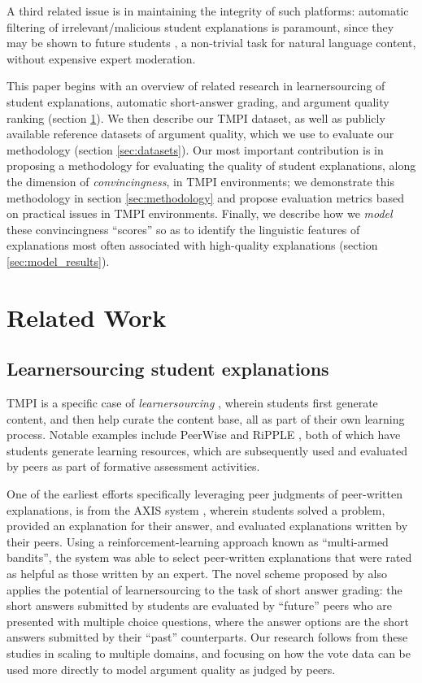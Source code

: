 \documentclass[notitlepage,12pt]{jedm}
\begin{document}
A third related issue is in maintaining the integrity of such platforms: 
automatic filtering of irrelevant/malicious student explanations is paramount, 
since they may be shown to future students \cite{gagnon_filtering_2019}, a 
non-trivial task for natural language content, without expensive expert 
moderation.

This paper begins with an overview of related research in learnersourcing of 
student explanations, automatic short-answer grading, and argument quality 
ranking (section \ref{sec:related_work}).
We then describe our TMPI dataset, as well as publicly available reference 
datasets of argument quality, which we use to evaluate our methodology (section 
\ref{sec:datasets}).
Our most important contribution is in proposing a methodology for evaluating 
the quality of student explanations, along the dimension of 
\textit{convincingness}, in TMPI environments; we demonstrate this methodology 
in section \ref{sec:methodology} and propose evaluation metrics based on 
practical issues in TMPI environments.
Finally, we describe how we \textit{model} these convincingness ``scores'' so 
as to identify the linguistic features of explanations most often associated 
with high-quality explanations (section \ref{sec:model_results}).


\section{Related Work}\label{sec:related_work}

\subsection{Learnersourcing student explanations}
TMPI is a specific case of  \textit{learnersourcing} 
\cite{weir_learnersourcing_2015}, wherein students first generate content, and 
then help curate the content base, all as part of their own learning process.
Notable examples include PeerWise \cite{denny_peerwise:_2008} and RiPPLE 
\cite{khosravi_ripple_2019}, both of which have students generate learning 
resources, which are subsequently used and evaluated by peers as part of 
formative assessment activities.

One of the earliest efforts specifically leveraging peer judgments of 
peer-written explanations, is from the AXIS system \cite{williams_axis:_2016}, 
wherein students solved a problem, provided an explanation for their answer, 
and evaluated explanations written by their peers.
Using a reinforcement-learning approach known as ``multi-armed bandits'', the 
system was able to select peer-written explanations that were rated as helpful 
as those written by an expert.
The novel scheme proposed by \cite{kolhe_peer_2016} also applies the potential 
of learnersourcing to the task of short answer grading: the short answers 
submitted by students are evaluated by ``future'' peers who are presented with 
multiple choice questions, where the answer options are the short answers 
submitted by their ``past'' counterparts.
Our research follows from these studies in scaling to multiple domains, and 
focusing on how the vote data can be used more directly to model argument 
quality as judged by peers.
\end{document}
